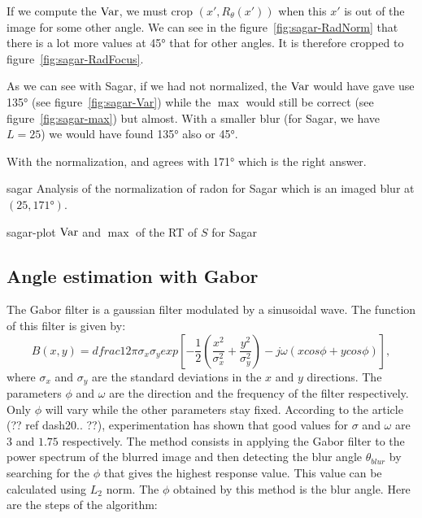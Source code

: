 If we compute the $\operatorname{Var}$, we must crop $(x',R_\theta(x'))$ when
this $x'$ is out of the image for some other angle.
We can see in the figure~\ref{fig:sagar-RadNorm} that
there is a lot more values at \ang{45} that for other angles.
It is therefore cropped to figure~\ref{fig:sagar-RadFocus}.

As we can see with Sagar, if we had not normalized,
the $\operatorname{Var}$ would have gave use \ang{135}
(see figure~\ref{fig:sagar-Var}) while the $\max$
would still be correct
(see figure~\ref{fig:sagar-max}) but almost.
With a smaller blur (for Sagar, we have $L = 25$) we would
have found \ang{135} also or \ang{45}.

With the normalization,  and
 agrees with \ang{171} which is the right
answer.

\begin{myfig}{sagar}
  {Analysis of the normalization of radon for Sagar which is an imaged blur at
  $(25,\ang{171})$.}
\end{myfig}
\begin{myfig}{sagar-plot}
  {$\operatorname{Var}$ and $\max$ of the RT of $S$ for Sagar}
\end{myfig}

\subsection{Angle estimation with Gabor}
The Gabor filter is a gaussian filter modulated by a sinusoidal wave. The function of this filter is given by:
\begin{equation}
B(x,y)=dfrac{1}{2\pi \sigma_x \sigma_y} exp\left[-\frac{1}{2}\left(\frac{x^2}{\sigma_x^2}+ \frac{y^2}{\sigma_y^2} \right) -j\omega(xcos\phi + ycos\phi)\right],
\label{filtreGabor}
\end{equation}
where $\sigma_x$ and $\sigma_y$ are the standard deviations in the $x$ and $y$ directions. The parameters $\phi$ and $\omega$ are the direction and the frequency of the filter respectively. Only $\phi$ will vary while the other parameters stay fixed. According to the article (?? ref dash20.. ??), experimentation has shown that good values for $\sigma$ and $\omega$ are $3$ and $1.75$ respectively. The method consists in applying the Gabor filter to the power spectrum of the blurred image and then detecting the blur angle $\theta_{blur}$ by searching for the $\phi$ that gives the highest response value. This value can be calculated using $L_2$ norm. The $\phi$ obtained by this method is the blur angle. Here are the steps of the algorithm:

